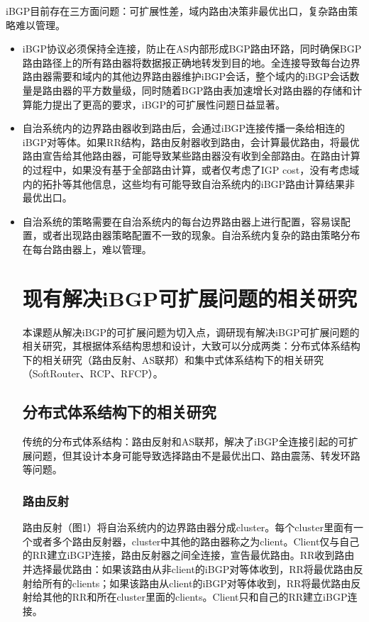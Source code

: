 iBGP\cite{ibgp2016infocom}目前存在三方面问题：可扩展性差，域内路由决策非最优出口，复杂路由策略难以管理。
\begin{itemize}
\item iBGP协议必须保持全连接，防止在AS内部形成BGP路由环路，同时确保BGP路由路径上的所有路由器将数据报正确地转发到目的地。全连接导致每台边界路由器需要和域内的其他边界路由器维护iBGP会话，整个域内的iBGP会话数量是路由器的平方数量级，同时随着BGP路由表加速增长对路由器的存储和计算能力提出了更高的要求，iBGP的可扩展性问题日益显著。
\item 自治系统内的边界路由器收到路由后，会通过iBGP连接传播一条给相连的iBGP对等体。如果RR结构，路由反射器收到路由，会计算最优路由，将最优路由宣告给其他路由器，可能导致某些路由器没有收到全部路由。在路由计算的过程中，如果没有基于全部路由计算，或者仅考虑了IGP cost，没有考虑域内的拓扑等其他信息，这些均有可能导致自治系统内的iBGP路由计算结果非最优出口。
\item 自治系统的策略需要在自治系统内的每台边界路由器上进行配置，容易误配置，或者出现路由器策略配置不一致的现象。自治系统内复杂的路由策略分布在每台路由器上，难以管理。

\section{现有解决iBGP可扩展问题的相关研究}
本课题从解决iBGP的可扩展问题为切入点，调研现有解决iBGP可扩展问题的相关研究，其根据体系结构思想和设计，大致可以分成两类：分布式体系结构下的相关研究（路由反射、AS联邦）和集中式体系结构下的相关研究（SoftRouter、RCP、RFCP）。

\subsection{分布式体系结构下的相关研究}
传统的分布式体系结构：路由反射和AS联邦，解决了iBGP全连接引起的可扩展问题，但其设计本身可能导致选择路由不是最优出口、路由震荡、转发环路等问题。

\subsubsection{路由反射}
路由反射（图1）将自治系统内的边界路由器分成cluster。每个cluster里面有一个或者多个路由反射器，cluster中其他的路由器称之为client。Client仅与自己的RR建立iBGP连接，路由反射器之间全连接，宣告最优路由。RR收到路由并选择最优路由：如果该路由从非client的iBGP对等体收到，RR将最优路由反射给所有的clients；如果该路由从client的iBGP对等体收到，RR将最优路由反射给其他的RR和所在cluster里面的clients。Client只和自己的RR建立iBGP连接。


\end{itemize}
